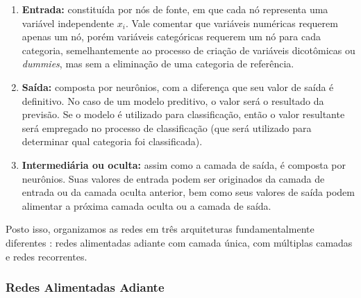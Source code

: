 \documentclass{automatextcc}
\newcommand{\bs}[1]{\boldsymbol{#1}}
\begin{document}
\begin{enumerate}
    \item \textbf{Entrada:} constituída por nós de fonte, em que cada nó representa uma variável independente $x_i$. Vale comentar que variáveis numéricas requerem apenas um nó, porém variáveis categóricas requerem um nó para cada categoria, semelhantemente ao processo de criação de variáveis dicotômicas ou \textit{dummies}, mas sem a eliminação de uma categoria de referência.
    \item \textbf{Saída:} composta por neurônios, com a diferença que seu valor de saída é definitivo. No caso de um modelo preditivo, o valor será o resultado da previsão. Se o modelo é utilizado para classificação, então o valor resultante será empregado no processo de classificação (que será utilizado para determinar qual categoria foi classificada).
    \item \textbf{Intermediária ou oculta:} assim como a camada de saída, é composta por neurônios. Suas valores de entrada podem ser originados da camada de entrada ou da camada oculta anterior, bem como seus valores de saída podem alimentar a próxima camada oculta ou a camada de saída.
\end{enumerate}
Posto isso, organizamos as redes em três arquiteturas fundamentalmente diferentes \citep{haykin2001,hair2005,hagan2014}: redes alimentadas adiante com camada única, com múltiplas camadas e redes recorrentes.


\subsubsection{Redes Alimentadas Adiante}


\end{document}
